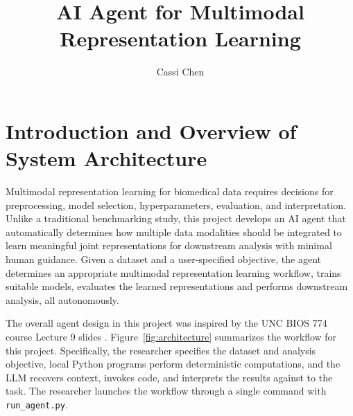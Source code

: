 \documentclass[10pt]{article}
\title{\vspace{-1.4cm}AI Agent for Multimodal Representation Learning}
\author{Cassi Chen}\date{}
\begin{document}
\maketitle\vspace{-0.8cm}

\section{Introduction and Overview of System Architecture}

Multimodal representation learning for biomedical data requires decisions for preprocessing, model selection, hyperparameters, evaluation, 
and interpretation. Unlike a traditional benchmarking study, this project develops an AI agent that automatically 
determines how multiple data modalities should be integrated to learn meaningful joint representations 
for downstream analysis with minimal human guidance. Given a dataset and a user-specified objective, 
the agent determines an appropriate multimodal representation learning workflow, trains suitable models, 
evaluates the learned representations and performs downstream analysis, all autonomously.

The overall agent design in this project was inspired by the UNC BIOS 774 course Lecture 9 slides \cite{bios774slides}. 
Figure~\ref{fig:architecture} summarizes the workflow for this project. Specifically, the researcher specifies the dataset and analysis objective, local Python programs perform deterministic 
computations, and the LLM recovers context, invokes code, and interprets the results against to the task. 
The researcher launches the workflow through a single command with \texttt{run\_agent.py}. 
\end{document}
